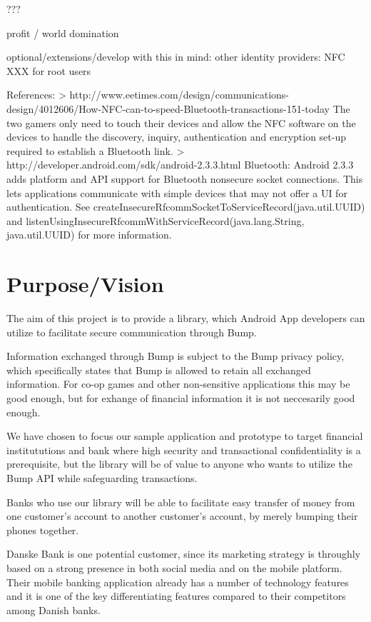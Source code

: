 \documentclass[a4paper,11pt]{article}
\begin{document}
???

profit / world domination


optional/extensions/develop with this in mind:
other identity providers: NFC
XXX for root users

References:
> http://www.eetimes.com/design/communications-design/4012606/How-NFC-can-to-speed-Bluetooth-transactions-151-today
The two gamers only need to touch their devices and allow the NFC software on the devices to handle the discovery, inquiry, authentication and encryption set-up required to establish a Bluetooth link.
> http://developer.android.com/sdk/android-2.3.3.html
Bluetooth: Android 2.3.3 adds platform and API support for Bluetooth nonsecure socket connections. This lets applications communicate with simple devices that may not offer a UI for authentication. See createInsecureRfcommSocketToServiceRecord(java.util.UUID) and listenUsingInsecureRfcommWithServiceRecord(java.lang.String, java.util.UUID) for more information.




\pagebreak 

\section{Purpose/Vision} %
\label{sec:purpose_vision}

The aim of this project is to provide a library, which Android App developers can utilize to facilitate secure communication through Bump.

Information exchanged through Bump is subject to the Bump privacy policy, which specifically states that Bump is allowed to retain all exchanged information. For co-op games and other non-sensitive applications this may be good enough, but for exhange of financial information it is not neccesarily good enough.

We have chosen to focus our sample application and prototype to target financial institututions and bank where high security and transactional confidentiality is a prerequisite, but the library will be of value to anyone who wants to utilize the Bump API while safeguarding transactions.

Banks who use our library will be able to facilitate easy transfer of money from one customer's account to another customer's account, by merely bumping their phones together.

Danske Bank is one potential customer, since its marketing strategy is throughly based on a strong presence in both social media and on the mobile platform. Their mobile banking application already has a number of technology features and it is one of the key differentiating features compared to their competitors among Danish banks.
\end{document}
